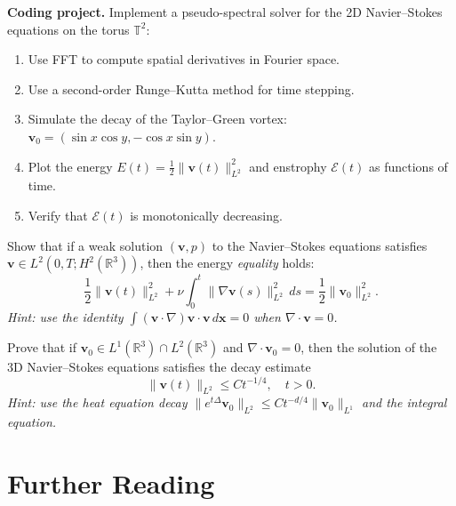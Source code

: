 \begin{exercise}
\label{ex:NS-simulation}
\textbf{Coding project.} Implement a pseudo-spectral solver for the 2D Navier--Stokes equations on the torus $\mathbb{T}^2$:
\begin{enumerate}
\item Use FFT to compute spatial derivatives in Fourier space.
\item Use a second-order Runge--Kutta method for time stepping.
\item Simulate the decay of the Taylor--Green vortex: $\mathbf{v}_0 = (\sin x \cos y, -\cos x \sin y)$.
\item Plot the energy $E(t) = \frac{1}{2}\|\mathbf{v}(t)\|_{L^2}^2$ and enstrophy $\mathcal{E}(t)$ as functions of time.
\item Verify that $\mathcal{E}(t)$ is monotonically decreasing.
\end{enumerate}
\end{exercise}

\begin{exercise}
\label{ex:NS-energy-equality}
Show that if a weak solution $(\mathbf{v}, p)$ to the Navier--Stokes equations satisfies $\mathbf{v} \in L^2(0, T; H^2(\mathbb{R}^3))$, then the energy \emph{equality} holds:
\[
\frac{1}{2}\|\mathbf{v}(t)\|_{L^2}^2 + \nu \int_0^t \|\nabla \mathbf{v}(s)\|_{L^2}^2 \, ds = \frac{1}{2}\|\mathbf{v}_0\|_{L^2}^2.
\]
\textit{Hint: use the identity $\int (\mathbf{v} \cdot \nabla)\mathbf{v} \cdot \mathbf{v} \, d\mathbf{x} = 0$ when $\nabla \cdot \mathbf{v} = 0$.}
\end{exercise}

\begin{exercise}
\label{ex:NS-decay}
Prove that if $\mathbf{v}_0 \in L^1(\mathbb{R}^3) \cap L^2(\mathbb{R}^3)$ and $\nabla \cdot \mathbf{v}_0 = 0$, then the solution of the 3D Navier--Stokes equations satisfies the decay estimate
\[
\|\mathbf{v}(t)\|_{L^2} \le C t^{-1/4}, \quad t > 0.
\]
\textit{Hint: use the heat equation decay $\|e^{t\Delta}\mathbf{v}_0\|_{L^2} \le C t^{-d/4}\|\mathbf{v}_0\|_{L^1}$ and the integral equation.}
\end{exercise}

\section{Further Reading}

